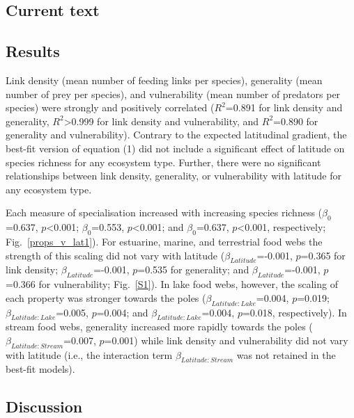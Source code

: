 \documentclass[12pt]{article}
\begin{document}
\begin{spacing}{2.0}

\section*{Current text} 

  \subsection*{Results}

    Link density (mean number of feeding links per species), generality (mean
    number of prey per species), and vulnerability (mean number of predators per
    species) were strongly and positively correlated ($R^2$=0.891 for link
    density and generality, $R^2$\textgreater0.999 for link density and
    vulnerability, and $R^2$=0.890 for generality and vulnerability). Contrary
    to the expected latitudinal gradient, the best-fit version of
    equation (1) did not include a significant
    effect of latitude on species richness for any ecosystem type. Further, there were no significant
    relationships between link density, generality, or vulnerability with
    latitude for any ecosystem type.


    Each measure of specialisation increased with increasing
    species richness ($\beta_0$=0.637, $p$\textless0.001; $\beta_0$=0.553,
    $p$\textless0.001; and $\beta_0$=0.637, $p$\textless0.001, respectively;
    Fig.~\ref{props_v_lat1}). For estuarine, marine, and terrestrial food webs the
    strength of this scaling did not vary with latitude
    ($\beta_{Latitude}$=-0.001, $p$=0.365 for link density;
    $\beta_{Latitude}$=-0.001, $p$=0.535 for generality; and
    $\beta_{Latitude}$=-0.001, $p$=0.366 for vulnerability; Fig.~\ref{S1}). In
    lake food webs, however, the scaling of each property was stronger towards
    the poles ($\beta_{Latitude:Lake}$=0.004, $p$=0.019;
    $\beta_{Latitude:Lake}$=0.005, $p$=0.004; and
    $\beta_{Latitude:Lake}$=0.004, $p$=0.018, respectively). In stream food
    webs, generality increased more rapidly towards the poles
    ($\beta_{Latitude:Stream}$=0.007, $p$=0.001) while link density and
    vulnerability did not vary with latitude (i.e., the interaction term 
    $\beta_{Latitude:Stream}$ was not retained in the best-fit models).


  \subsection*{Discussion}


\end{spacing}
\end{document}
